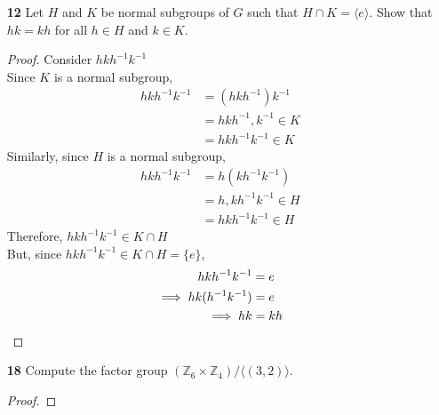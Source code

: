 \documentclass[paper=usletter, fontsize=12pt]{article}
\begin{document}
\begin{itemize}
\begin{enumerate}
\begin{proof}
                $aHa^{-1}$ is the subgroup of $G$ that is isomorphic to $H$\\
                Therefore, $aHa^{-1}=H$, $\forall a \in G$\\
                Which is true iff $H$ is a normal subgroup in $G$ \qedhere

            \end{proof}

            \item[\textbf{12}] Let $H$ and $K$ be normal subgroups of $G$ such
            that $H \cap K=\langle e \rangle$. Show that $hk=kh$ for all $h \in
            H$ and $k \in K$.
            \begin{proof}

                Consider $hkh^{-1}k^{-1}$\\
                Since $K$ is a normal subgroup,
                \begin{align*}
                    hkh^{-1}k^{-1} & = (hkh^{-1})k^{-1}\\
                    & = hkh^{-1},k^{-1} \in K\\
                    & = hkh^{-1}k^{-1} \in K
                \end{align*}
                Similarly, since $H$ is a normal subgroup,
                \begin{align*}
                    hkh^{-1}k^{-1} & = h(kh^{-1}k^{-1})\\
                    & = h,kh^{-1}k^{-1} \in H\\
                    & = hkh^{-1}k^{-1} \in H
                \end{align*}
                Therefore, $hkh^{-1}k^{-1} \in K \cap H$\\
                But, since $hkh^{-1}k^{-1} \in K \cap H = \{e\}$,
                \begin{align*}
                    hkh^{-1}k^{-1} &= e\\
                    \implies hk(h^{-1}k^{-1}) &= e\\
                    \implies hk &= kh \qedhere
                \end{align*}

            \end{proof}

            \item[\textbf{18}] Compute the factor group $(\mathbb{Z}_6 \times
            \mathbb{Z}_4)/ \langle(3,2)\rangle$.
            \begin{proof}


\end{proof}
\end{enumerate}
\end{itemize}
\end{document}
